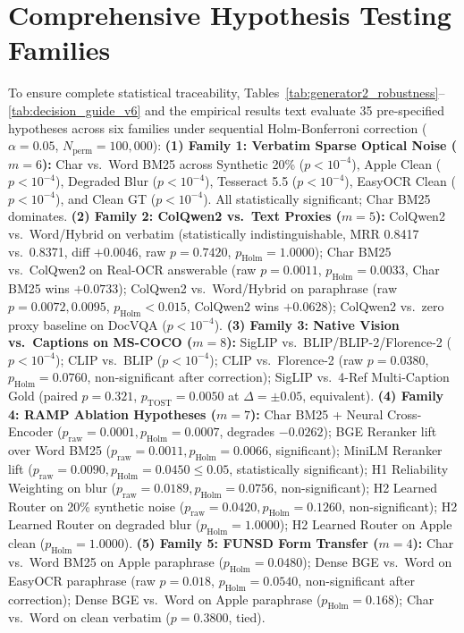 \vspace{-1mm}
\appendices
\vspace{-1.5mm}\section{Comprehensive Hypothesis Testing Families}
\label{sec:appendix_holm}
{\scriptsize To ensure complete statistical traceability, Tables~\ref{tab:generator2_robustness}--\ref{tab:decision_guide_v6} and the empirical results text evaluate 35 pre-specified hypotheses across six families under sequential Holm-Bonferroni correction ($\alpha=0.05$, $N_{\text{perm}}=100{,}000$):
\textbf{(1) Family 1: Verbatim Sparse Optical Noise ($m=6$):} Char vs.\ Word BM25 across Synthetic 20\% ($p < 10^{-4}$), Apple Clean ($p < 10^{-4}$), Degraded Blur ($p < 10^{-4}$), Tesseract 5.5 ($p < 10^{-4}$), EasyOCR Clean ($p < 10^{-4}$), and Clean GT ($p < 10^{-4}$). All statistically significant; Char BM25 dominates.
\textbf{(2) Family 2: ColQwen2 vs.\ Text Proxies ($m=5$):} ColQwen2 vs.\ Word/Hybrid on verbatim (statistically indistinguishable, MRR 0.8417 vs.\ 0.8371, diff $+0.0046$, raw $p=0.7420$, $p_{\text{Holm}}=1.0000$); Char BM25 vs.\ ColQwen2 on Real-OCR answerable (raw $p=0.0011$, $p_{\text{Holm}}=0.0033$, Char BM25 wins $+0.0733$); ColQwen2 vs.\ Word/Hybrid on paraphrase (raw $p=0.0072, 0.0095$, $p_{\text{Holm}} < 0.015$, ColQwen2 wins $+0.0628$); ColQwen2 vs.\ zero proxy baseline on DocVQA ($p < 10^{-4}$).
\textbf{(3) Family 3: Native Vision vs.\ Captions on MS-COCO ($m=8$):} SigLIP vs.\ BLIP/BLIP-2/Florence-2 ($p < 10^{-4}$); CLIP vs.\ BLIP ($p < 10^{-4}$); CLIP vs.\ Florence-2 (raw $p=0.0380$, $p_{\text{Holm}}=0.0760$, non-significant after correction); SigLIP vs.\ 4-Ref Multi-Caption Gold (paired $p=0.321$, $p_{\text{TOST}}=0.0050$ at $\Delta=\pm 0.05$, equivalent).
\textbf{(4) Family 4: RAMP Ablation Hypotheses ($m=7$):} Char BM25 + Neural Cross-Encoder ($p_{\text{raw}}=0.0001, p_{\text{Holm}}=0.0007$, degrades $-0.0262$); BGE Reranker lift over Word BM25 ($p_{\text{raw}}=0.0011, p_{\text{Holm}}=0.0066$, significant); MiniLM Reranker lift ($p_{\text{raw}}=0.0090, p_{\text{Holm}}=0.0450 \le 0.05$, statistically significant); H1 Reliability Weighting on blur ($p_{\text{raw}}=0.0189, p_{\text{Holm}}=0.0756$, non-significant); H2 Learned Router on 20\% synthetic noise ($p_{\text{raw}}=0.0420, p_{\text{Holm}}=0.1260$, non-significant); H2 Learned Router on degraded blur ($p_{\text{Holm}}=1.0000$); H2 Learned Router on Apple clean ($p_{\text{Holm}}=1.0000$).
\textbf{(5) Family 5: FUNSD Form Transfer ($m=4$):} Char vs.\ Word BM25 on Apple paraphrase ($p_{\text{Holm}}=0.0480$); Dense BGE vs.\ Word on EasyOCR paraphrase (raw $p=0.018$, $p_{\text{Holm}}=0.0540$, non-significant after correction); Dense BGE vs.\ Word on Apple paraphrase ($p_{\text{Holm}}=0.168$); Char vs.\ Word on clean verbatim ($p=0.3800$, tied).
}
